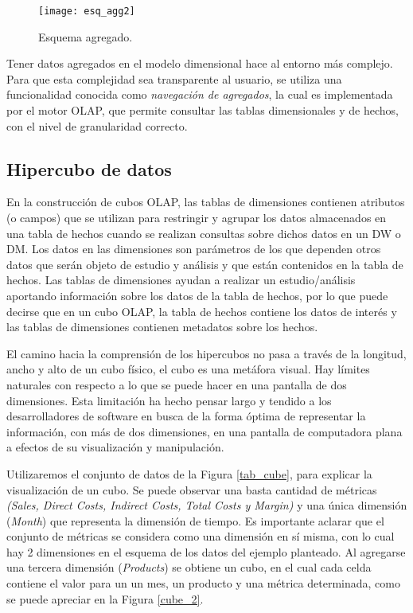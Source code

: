 \documentclass[a4paper,11pt]{article}
\begin{document}
    \begin{figure}
      \begin{center}
        \texttt{[image: esq\_agg2]}
        \caption{Esquema agregado. \cite{agg_tables}}
        \label{sch_agg2}
      \end{center}
    \end{figure}
    
    Tener datos agregados en el modelo dimensional hace al entorno más complejo. Para que esta complejidad sea transparente al usuario, se utiliza
    una funcionalidad conocida como \textit{navegación de agregados}, la cual es implementada por el motor OLAP, que permite consultar las
    tablas dimensionales y de hechos, con el nivel de granularidad correcto.
    
    
    \subsection{Hipercubo de datos}
    
    En la construcción de cubos OLAP, las tablas de dimensiones contienen atributos (o campos) que se utilizan para restringir y agrupar
    los datos almacenados en una tabla de hechos cuando se realizan consultas sobre dichos datos en un DW o DM. Los datos en las dimensiones son parámetros
    de los que dependen otros datos que serán objeto de estudio y análisis y que están contenidos en la tabla de hechos. Las tablas de dimensiones ayudan a
    realizar un estudio/análisis aportando información sobre los datos de la tabla de hechos, por lo que puede decirse que en un cubo OLAP, la tabla de
    hechos contiene los datos de interés y las tablas de dimensiones contienen metadatos sobre los hechos.

    El camino hacia la comprensión de los hipercubos no pasa a través de la longitud, ancho y alto de un cubo físico, el cubo es una metáfora visual. Hay
    límites naturales con respecto a lo que se puede hacer en una pantalla de dos dimensiones. Esta limitación ha hecho pensar largo y tendido a los
    desarrolladores de software en busca de la forma óptima de representar la información, con más de dos dimensiones, en una pantalla de computadora plana a
    efectos de su visualización y manipulación.
    
    Utilizaremos el conjunto de datos de la Figura \ref{tab_cube}, para explicar la visualización de un cubo. Se puede observar una basta cantidad de
    métricas \textit{(Sales, Direct Costs, Indirect Costs, Total Costs y Margin)} y una única dimensión (\textit{Month}) que representa la dimensión de tiempo.
    Es importante aclarar que el conjunto de métricas se considera como una dimensión en sí misma, con lo cual hay 2 dimensiones en el esquema de
    los datos del ejemplo planteado. Al agregarse una tercera dimensión (\textit{Products}) se obtiene un cubo, en el cual cada celda contiene el valor para un un mes,
    un producto y una métrica determinada, como se puede apreciar en la Figura \ref{cube_2}.
    
\end{document}
